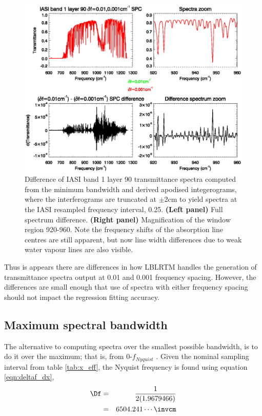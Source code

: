 \begin{figure}[htp]
  \centering
  \includegraphics[bb=70 230 540 390,clip,scale=0.8]{graphics/band1_lyr90_dspc_comparison_z-920-960_iasidf_mindeltaf.eps}
  \caption{Difference of IASI band 1 layer 90 transmittance spectra computed from the minimum bandwidth  and  derived apodised integerograms, where the interferograms are truncated at $\pm$2cm to yield spectra at the IASI resampled frequency interval, 0.25\invcm. \textbf{(Left panel)} Full spectrum difference. \textbf{(Right panel)} Magnification of the window region 920-960\invcm. Note the frequency shifts of the \carbondioxide{} absorption line centres are still apparent, but now line width differences due to weak water vapour lines are also visible.}
  \label{fig:band1_lyr90_dspc_comparison_z-920-960_iasidf_mindeltaf}
\end{figure}

Thus is appears there are differences in how LBLRTM handles the generation of transmittance spectra output at 0.01\invcm{} and 0.001\invcm{} frequency spacing. However, the differences are small enough that use of spectra with either frequency spacing should not impact the regression fitting accuracy.


\subsection{Maximum spectral bandwidth}
The alternative to computing spectra over the smallest possible bandwidth, is to do it over the maximum; that is, from 0-$f_{Nyquist}$ {\invcm}. Given the nominal sampling interval from table \ref{tab:x_eff}, the Nyquist frequency is found using
equation \ref{eqn:deltaf_dx},
\begin{eqnarray*}
  \Df & = & \frac{1}{2(1.9679466)}\\
      & = & 6504.241\cdots \textrm{\invcm}
\end{eqnarray*}

